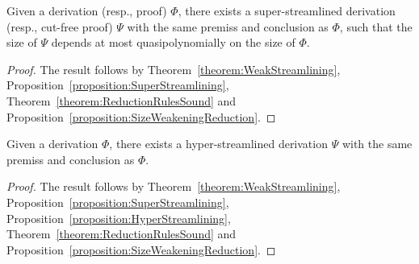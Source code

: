 \begin{corollary}\label{corollary:SuperStreamlining}
Given a derivation (resp., proof)\/ $\Phi$, there exists a super-streamlined derivation (resp., cut-free proof)\/ $\Psi$ with the same premiss and conclusion as\/ $\Phi$, such that the size of\/ $\Psi$ depends at most quasipolynomially on the size of\/ $\Phi$.
\end{corollary}

\begin{proof}
The result follows by Theorem~\vref{theorem:WeakStreamlining}, Proposition~\vref{proposition:SuperStreamlining}, Theorem~\vref{theorem:ReductionRulesSound} and Proposition~\vref{proposition:SizeWeakeningReduction}.
\end{proof}

\begin{corollary}\label{corollary:HyperStreamlining}
Given a derivation\/ $\Phi$, there exists a hyper-streamlined derivation\/ $\Psi$ with the same premiss and conclusion as\/ $\Phi$.
\end{corollary}

\begin{proof}
The result follows by Theorem~\vref{theorem:WeakStreamlining}, Proposition~\vref{proposition:SuperStreamlining}, Proposition~\vref{proposition:HyperStreamlining}, Theorem~\vref{theorem:ReductionRulesSound} and Proposition~\vref{proposition:SizeWeakeningReduction}.
\end{proof}
